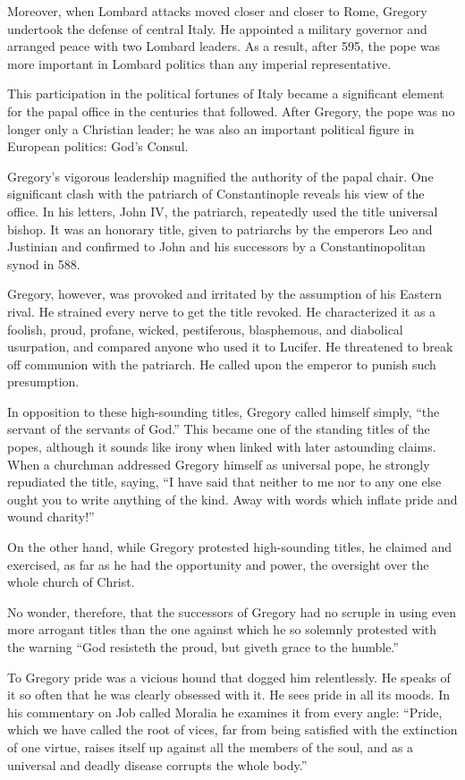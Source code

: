 Moreover, when Lombard attacks moved closer and closer to Rome, Gregory undertook the defense of
central Italy. He appointed a military governor and arranged peace with two Lombard leaders. As a
result, after 595, the pope was more important in Lombard politics than any imperial representative.

This participation in the political fortunes of Italy became a significant element for the papal
office in the centuries that followed. After Gregory, the pope was no longer only a Christian
leader; he was also an important political figure in European politics: God’s Consul.

Gregory’s vigorous leadership magnified the authority of the papal chair. One significant clash with
the patriarch of Constantinople reveals his view of the office. In his letters, John IV, the
patriarch, repeatedly used the title universal bishop. It was an honorary title, given to patriarchs
by the emperors Leo and Justinian and confirmed to John and his successors by a Constantinopolitan
synod in 588.

Gregory, however, was provoked and irritated by the assumption of his Eastern rival. He strained
every nerve to get the title revoked. He characterized it as a foolish, proud, profane, wicked,
pestiferous, blasphemous, and diabolical usurpation, and compared anyone who used it to Lucifer. He
threatened to break off communion with the patriarch. He called upon the emperor to punish such
presumption.

In opposition to these high-sounding titles, Gregory called himself simply, “the servant of the
servants of God.” This became one of the standing titles of the popes, although it sounds like irony
when linked with later astounding claims. When a churchman addressed Gregory himself as universal
pope, he strongly repudiated the title, saying, “I have said that neither to me nor to any one else
ought you to write anything of the kind. Away with words which inflate pride and wound charity!”

On the other hand, while Gregory protested high-sounding titles, he claimed and exercised, as far as
he had the opportunity and power, the oversight over the whole church of Christ.

No wonder, therefore, that the successors of Gregory had no scruple in using even more arrogant
titles than the one against which he so solemnly protested with the warning “God resisteth the
proud, but giveth grace to the humble.”

To Gregory pride was a vicious hound that dogged him relentlessly. He speaks of it so often that he
was clearly obsessed with it. He sees pride in all its moods. In his commentary on Job called
Moralia he examines it from every angle: “Pride, which we have called the root of vices, far from
being satisfied with the extinction of one virtue, raises itself up against all the members of the
soul, and as a universal and deadly disease corrupts the whole body.”

